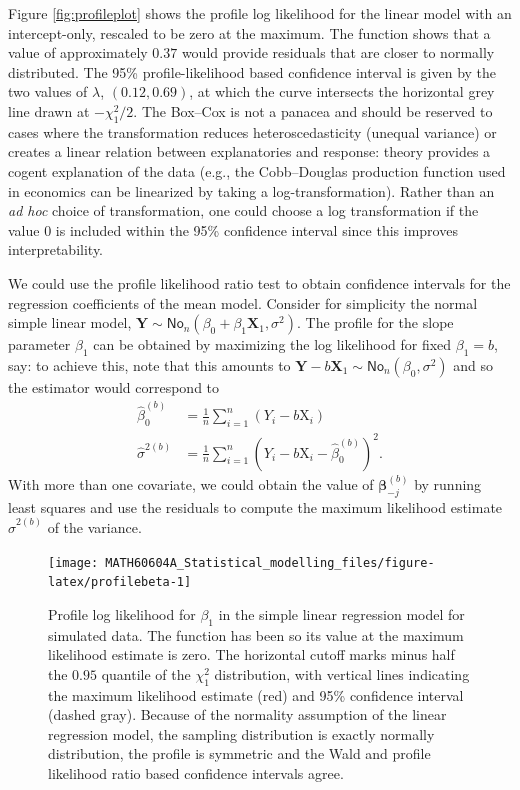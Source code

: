 \documentclass[
  11pt,
  letterpaper,
]{book}
\theoremstyle{definition}
\theoremstyle{definition}
\theoremstyle{definition}
\theoremstyle{remark}
\begin{document}
Figure \ref{fig:profileplot} shows the profile log likelihood for the linear model with an intercept-only, rescaled to be zero at the maximum. The function shows that a value of approximately \(0.37\) would provide residuals that are closer to normally distributed. The 95\% profile-likelihood based confidence interval is given by the two values of \(\lambda\), \((0.12, 0.69)\), at which the curve intersects the horizontal grey line drawn at \(-\chi^2_1/2\). The Box--Cox is not a panacea and should be reserved to cases where the transformation reduces heteroscedasticity (unequal variance) or creates a linear relation between explanatories and response: theory provides a cogent explanation of the data (e.g., the Cobb--Douglas production function used in economics can be linearized by taking a log-transformation). Rather than an \emph{ad hoc} choice of transformation, one could choose a log transformation if the value \(0\) is included within the 95\% confidence interval since this improves interpretability.

We could use the profile likelihood ratio test to obtain confidence intervals for the regression coefficients of the mean model. Consider for simplicity the normal simple linear model, \(\boldsymbol{Y} \sim \mathsf{No}_n(\beta_0 + \beta_1\mathbf{X}_1, \sigma^2)\). The profile for the slope parameter \(\beta_1\) can be obtained by maximizing the log likelihood for fixed \(\beta_1=b\), say: to achieve this, note that this amounts to \(\boldsymbol{Y}-b\mathbf{X}_1 \sim \mathsf{No}_n(\beta_0, \sigma^2)\) and so the estimator would correspond to
\begin{align*}
\widehat{\beta}_{0}^{(b)}&=\frac{1}{n} \sum_{i=1}^n (Y_i-b\mathrm{X}_i)\\
\widehat{\sigma}^{2(b)} &= \frac{1}{n}\sum_{i=1}^n \left(Y_i-b\mathrm{X}_i-\widehat{\beta}_{0}^{(b)}\right)^2.
\end{align*}
With more than one covariate, we could obtain the value of \(\boldsymbol{\beta}_{-j}^{(b)}\) by running least squares and use the residuals to compute the maximum likelihood estimate \(\widehat{\sigma}^{2(b)}\) of the variance.

\begin{figure}

{\centering \texttt{[image: MATH60604A\_Statistical\_modelling\_files/figure-latex/profilebeta-1]} 

}

\caption{Profile log likelihood for $\beta_1$ in the simple linear regression model for simulated data. The function has been so its value at the maximum likelihood estimate is zero. The horizontal cutoff marks minus half the $0.95$ quantile of the $\chi^2_1$ distribution, with vertical lines indicating the maximum likelihood estimate (red) and 95\% confidence interval (dashed gray). Because of the normality assumption of the linear regression model, the sampling distribution is exactly normally distribution, the profile is symmetric and the Wald and profile likelihood ratio based confidence intervals agree.}\label{fig:profilebeta}
\end{figure}
\end{document}
